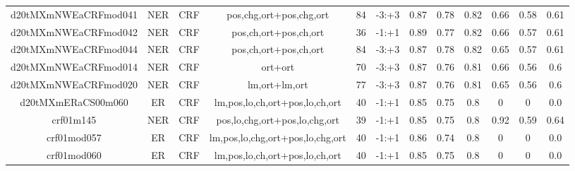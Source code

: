 \documentclass[a4paper]{article}
\begin{document}
\begin{landscape}
\begin{center}
\begin{tabular}{ |c|c|c|c|c|c|c|c|c|c|c|c|}
 	
 
 	
 		
 		\small{ d20tMXmNWEaCRFmod041 } & NER & CRF & pos,chg,ort+pos,chg,ort  &  84 &  -3:+3  &  0.87 & 0.78 & 0.82  &  0.66 & 0.58 & 0.61 \\
 		

 	
 
 	
 		
 		\small{ d20tMXmNWEaCRFmod042 } & NER & CRF & pos,ch,ort+pos,ch,ort  &  36 &  -1:+1  &  0.89 & 0.77 & 0.82  &  0.66 & 0.57 & 0.61 \\
 		

 	
 
 	
 		
 		\small{ d20tMXmNWEaCRFmod044 } & NER & CRF & pos,ch,ort+pos,ch,ort  &  84 &  -3:+3  &  0.87 & 0.78 & 0.82  &  0.65 & 0.57 & 0.61 \\
 		

 	
 
 	
 		
 		\small{ d20tMXmNWEaCRFmod014 } & NER & CRF & ort+ort  &  70 &  -3:+3  &  0.87 & 0.76 & 0.81  &  0.66 & 0.56 & 0.6 \\
 		

 	
 
 	
 		
 		\small{ d20tMXmNWEaCRFmod020 } & NER & CRF & lm,ort+lm,ort  &  77 &  -3:+3  &  0.87 & 0.76 & 0.81  &  0.65 & 0.56 & 0.6 \\
 		

 	
 
 	
 		
 		\small{ d20tMXmERaCS00m060 } & ER & CRF & lm,pos,lo,ch,ort+pos,lo,ch,ort  &  40 &  -1:+1  &  0.85 & 0.75 & 0.8  &  0 & 0 & 0.0 \\
 		

 	
 
 	
 		
 		\small{ crf01m145 } & NER & CRF & pos,lo,chg,ort+pos,lo,chg,ort  &  39 &  -1:+1  &  0.85 & 0.75 & 0.8  &  0.92 & 0.59 & 0.64 \\
 		

 	
 
 	
 		
 		\small{ crf01mod057 } & ER & CRF & lm,pos,lo,chg,ort+pos,lo,chg,ort  &  40 &  -1:+1  &  0.86 & 0.74 & 0.8  &  0 & 0 & 0.0 \\
 		

 	
 
 	
 		
 		\small{ crf01mod060 } & ER & CRF & lm,pos,lo,ch,ort+pos,lo,ch,ort  &  40 &  -1:+1  &  0.85 & 0.75 & 0.8  &  0 & 0 & 0.0 \\
 		


\end{tabular}
\end{center}
\end{landscape}
\end{document}
